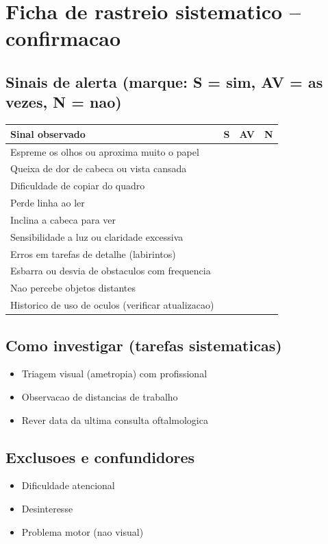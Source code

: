 \documentclass[a4paper,11pt]{book}
\begin{document}
\section*{Ficha de rastreio sistematico -- confirmacao}
\subsection*{Sinais de alerta (marque: S = sim, AV = as vezes, N = nao)}
\begin{tabular}{@{}p{11.5cm}ccc@{}}\toprule
Sinal observado & S & AV & N \\\midrule
Espreme os olhos ou aproxima muito o papel & & & \\
Queixa de dor de cabeca ou vista cansada & & & \\
Dificuldade de copiar do quadro & & & \\
Perde linha ao ler & & & \\
Inclina a cabeca para ver & & & \\
Sensibilidade a luz ou claridade excessiva & & & \\
Erros em tarefas de detalhe (labirintos) & & & \\
Esbarra ou desvia de obstaculos com frequencia & & & \\
Nao percebe objetos distantes & & & \\
Historico de uso de oculos (verificar atualizacao) & & & \\
\bottomrule\end{tabular}
\subsection*{Como investigar (tarefas sistematicas)}
\begin{itemize}
\item Triagem visual (ametropia) com profissional
\item Observacao de distancias de trabalho
\item Rever data da ultima consulta oftalmologica
\end{itemize}
\subsection*{Exclusoes e confundidores}
\begin{itemize}
\item Dificuldade atencional
\item Desinteresse
\item Problema motor (nao visual)
\end{itemize}
\end{document}
